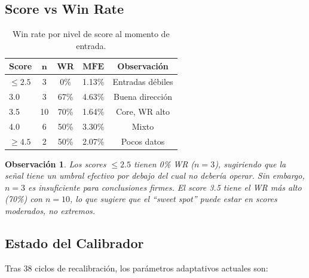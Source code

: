 \documentclass[11pt,a4paper]{article}
\newtheorem{remark}{Observaci\'on}[section]
\begin{document}
\subsection{Score vs Win Rate}

\begin{table}[H]
\centering
\caption{Win rate por nivel de score al momento de entrada.}
\label{tab:score_wr}
\begin{tabular}{lcccc}
\toprule
\textbf{Score} & $\bm{n}$ & \textbf{WR} & $\overline{\textbf{MFE}}$ & \textbf{Observaci\'on} \\
\midrule
$\leq 2.5$ & 3 & 0\% & 1.13\% & Entradas d\'ebiles \\
3.0 & 3 & 67\% & 4.63\% & Buena direcci\'on \\
3.5 & 10 & 70\% & 1.64\% & Core, WR alto \\
4.0 & 6 & 50\% & 3.30\% & Mixto \\
$\geq 4.5$ & 2 & 50\% & 2.07\% & Pocos datos \\
\bottomrule
\end{tabular}
\end{table}

\begin{remark}
Los scores $\leq 2.5$ tienen 0\% WR ($n=3$), sugiriendo que la
se\~nal tiene un umbral efectivo por debajo del cual no deber\'ia
operar. Sin embargo, $n=3$ es insuficiente para conclusiones firmes.
El score 3.5 tiene el WR m\'as alto (70\%) con $n=10$, lo que sugiere
que el ``sweet spot'' puede estar en scores moderados, no extremos.
\end{remark}


\subsection{Estado del Calibrador}

Tras 38 ciclos de recalibraci\'on, los par\'ametros adaptativos actuales son:
\end{document}
